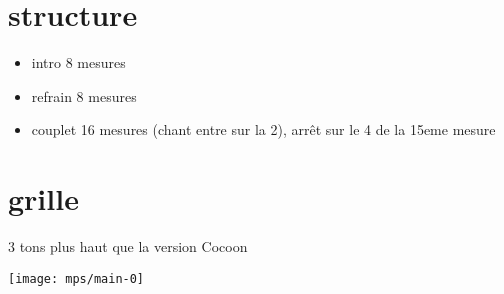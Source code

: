 \documentclass[11pt]{article}
\begin{document}
    \begin{center}
    \end{center}


    \section{structure}

    \begin{itemize}[noitemsep]
        \item     intro 8 mesures
        \item     refrain 8 mesures
        \item     couplet 16 mesures (chant entre sur la 2), arr\^et sur le 4 de la 15eme mesure
    \end{itemize}


    \section{grille}

    3  \textonehalf{}  tons plus haut que la version Cocoon

    \texttt{[image: mps/main-0]}

    




%    


%    
\end{document}
